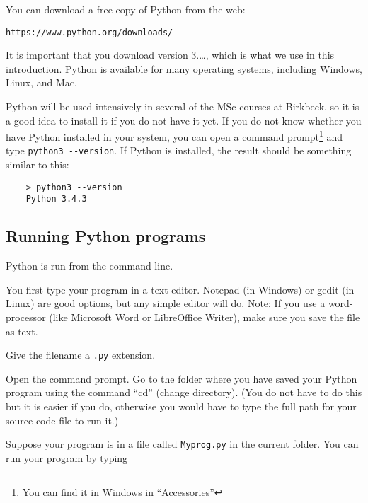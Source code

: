  
You can download a free copy of Python 
from the web:

\begin{verbatim}
https://www.python.org/downloads/
\end{verbatim}

It is important that you download version 3.\ldots, which is what we
use in this introduction.
Python is available for many
operating systems, including Windows, Linux, and Mac.%


Python will be used intensively in several of the MSc courses 
at Birkbeck, so it is a good idea to install it if you do not have it
yet.
If you do not know whether you have Python installed in your
system, you can open a command prompt\footnote{You can find it in Windows in
  ``Accessories''} and type
\verb+python3 --version+.
If Python is installed, the result should be something similar to this:

\begin{verbatim}
    > python3 --version
    Python 3.4.3
\end{verbatim}



\subsection*{Running Python programs}

Python is run from the command line.

You first type your program in a text editor. Notepad (in Windows) or
gedit (in Linux) are good options, but any simple editor will
do. Note: If you use a word-processor (like Microsoft Word or
LibreOffice Writer), make sure you save the file as text.

Give the filename a \texttt{.py} extension.

Open the command prompt. 
Go to the folder where you have saved your Python
program using the command ``cd'' (change directory). (You do not have to
do this but it is easier if you do, otherwise you would have to type the full
path for your source code file to run it.)

Suppose your program is in a file called
\texttt{Myprog.py} in the current folder.
You can run your program by typing

